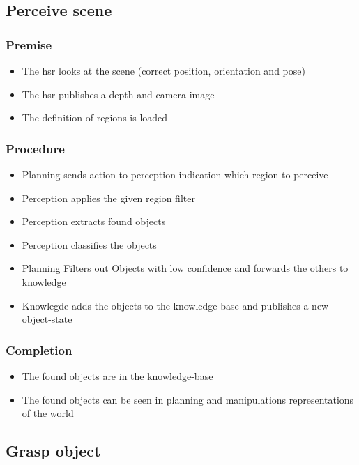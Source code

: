 \documentclass[main.tex]{subfiles}
\begin{document}
	\subsection{Perceive scene} 
	
	\subsubsection{Premise}
	\begin{itemize}
		\item The hsr looks at the scene (correct position, orientation and pose)
		\item The hsr publishes a depth and camera image
		\item The definition of regions is loaded 
	\end{itemize} 
	
	\subsubsection{Procedure}
	\begin{itemize}			
		\item Planning sends action to perception indication which region to perceive
		\item Perception applies the given region filter
		\item Perception extracts found objects
		\item Perception classifies the objects	
		\item Planning Filters out Objects with low confidence and forwards the others to knowledge
		\item Knowlegde adds the objects to the knowledge-base and publishes a new object-state			
	\end{itemize}
	
	\subsubsection{Completion}
	\begin{itemize}
		\item The found objects are in the knowledge-base
		\item The found objects can be seen in planning and manipulations representations of the world 		
	\end{itemize}
	
	\subsection{Grasp object}
	
\end{document}
